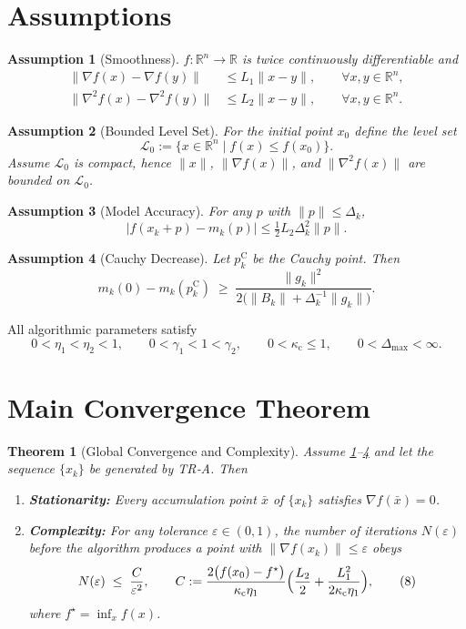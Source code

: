 \documentclass[11pt]{article}
\newtheorem{theorem}{Theorem}[section]
\newtheorem{assumption}{Assumption}[section]
\begin{document}
\newpage
\section*{Assumptions}
\begin{assumption}[Smoothness]\label{as:smooth}
$f:\mathbb{R}^{n}\rightarrow\mathbb{R}$ is twice continuously differentiable and
\begin{align}
\|\nabla f(x)-\nabla f(y)\| &\le L_{1}\|x-y\|,\qquad\forall x,y\in\mathbb{R}^{n}, \tag{A1}\\
\|\nabla^{2}f(x)-\nabla^{2}f(y)\| &\le L_{2}\|x-y\|,\qquad\forall x,y\in\mathbb{R}^{n}. \tag{A2}
\end{align}
\end{assumption}
\begin{assumption}[Bounded Level Set]\label{as:bounded}
For the initial point $x_{0}$ define the level set
\[
\mathcal{L}_{0}:=\{x\in\mathbb{R}^{n}\mid f(x)\le f(x_{0})\}.
\]
Assume $\mathcal{L}_{0}$ is compact, hence $\|x\|$, $\|\nabla f(x)\|$, and $\|\nabla^{2}f(x)\|$ are bounded on $\mathcal{L}_{0}$.
\end{assumption}
\begin{assumption}[Model Accuracy]\label{as:model}
For any $p$ with $\|p\|\le\Delta_{k}$,
\[
|f(x_{k}+p)-m_{k}(p)|
\le \tfrac12 L_{2}\Delta_{k}^{2}\|p\|. \tag{A3}
\]
\end{assumption}
\begin{assumption}[Cauchy Decrease]\label{as:cauchy}
Let $p^{\mathrm{C}}_{k}$ be the Cauchy point. Then
\[
m_{k}(0)-m_{k}(p^{\mathrm{C}}_{k})\;\ge\;\frac{\|g_{k}\|^{2}}{2\bigl(\|B_{k}\|+ \Delta_{k}^{-1}\|g_{k}\|\bigr)}.
\tag{A4}
\]
\end{assumption}

All algorithmic parameters satisfy
\[
0<\eta_{1}<\eta_{2}<1,\qquad
0<\gamma_{1}<1<\gamma_{2},\qquad
0<\kappa_{\mathrm{c}}\le1,\qquad
0<\Delta_{\max}<\infty .
\tag{A5}
\]

\section*{Main Convergence Theorem}
\begin{theorem}[Global Convergence and Complexity]\label{thm:main}
Assume \ref{as:smooth}–\ref{as:cauchy} and let the sequence $\{x_{k}\}$ be generated by TR‑A. Then
\begin{enumerate}[label=(\roman*)]
\item \textbf{Stationarity:} Every accumulation point $\bar x$ of $\{x_{k}\}$ satisfies $\nabla f(\bar x)=0$.
\item \textbf{Complexity:} For any tolerance $\varepsilon\in(0,1)$, the number of iterations $N(\varepsilon)$ before the algorithm produces a point with $\|\nabla f(x_{k})\|\le\varepsilon$ obeys
\[
N(\varepsilon)\;\le\;
\frac{C}{\varepsilon^{2}},
\qquad
C:=\frac{2\bigl(f(x_{0})-f^{\star}\bigr)}{\kappa_{\mathrm{c}}\eta_{1}}
\Bigl(\frac{L_{2}}{2}+ \frac{L_{1}^{2}}{2\kappa_{\mathrm{c}}\eta_{1}}\Bigr),
\tag{8}
\]
where $f^{\star}=\inf_{x}f(x)$.
\end{enumerate}
\end{theorem}
\end{document}
